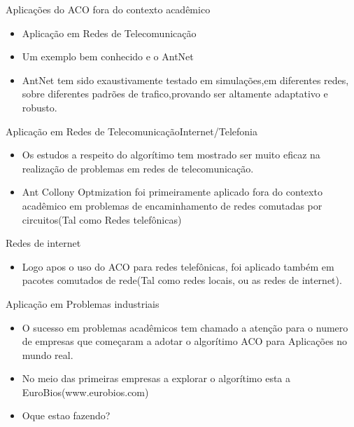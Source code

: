 \documentclass[compress]{beamer}
\begin{document}

\begin{frame}{Aplicações do ACO fora do contexto acadêmico}

\begin{itemize}
    \item Aplicação em Redes de Telecomunicação
    \newline
    \item Um exemplo bem conhecido e o AntNet
    \newline
    \item AntNet tem sido exaustivamente testado em simulações,em diferentes redes, sobre diferentes padrões de trafico,provando ser altamente adaptativo e robusto.
\end{itemize}
\end{frame}

\begin{frame}{Aplicação em Redes de Telecomunicação}{Internet/Telefonia}
  \begin{itemize}
  \item {
  Os estudos a respeito do algorítimo tem mostrado ser muito eficaz na realização de problemas em redes de telecomunicação.
  }
  \newline
  \item {
 Ant Collony Optmization foi primeiramente aplicado fora do contexto acadêmico em problemas de encaminhamento de redes comutadas por circuitos(Tal como Redes telefônicas)
  }
  \end{itemize}
\end{frame}


\begin{frame}{Redes de internet}
  \begin{itemize}
  \item {
Logo apos o uso do ACO para redes telefônicas, foi aplicado também em pacotes comutados de rede(Tal como redes locais, ou as redes de internet).
  }
  \end{itemize}
\end{frame}


\begin{frame}{Aplicação em Problemas industriais}
  \begin{itemize}
  \item {
  O sucesso em problemas acadêmicos tem chamado a atenção para o numero de empresas que começaram a adotar o algorítimo ACO para Aplicações no mundo real.
  }
  \newline
  \item {
 No meio das primeiras empresas a explorar o algorítimo esta a EuroBios(www.eurobios.com)}
  \newline
  \item{ Oque estao fazendo? }
  \end{itemize}
\end{frame}
\end{document}
